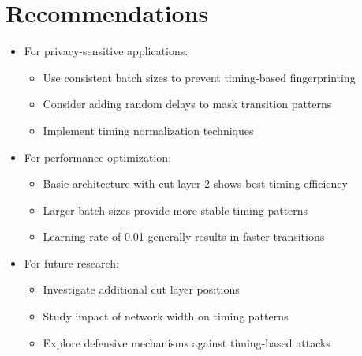 \documentclass[10pt]{article}
\begin{document}
\section{Recommendations}
\begin{itemize}
    \item For privacy-sensitive applications:
        \begin{itemize}
            \item Use consistent batch sizes to prevent timing-based fingerprinting
            \item Consider adding random delays to mask transition patterns
            \item Implement timing normalization techniques
        \end{itemize}
    \item For performance optimization:
        \begin{itemize}
            \item Basic architecture with cut layer 2 shows best timing efficiency
            \item Larger batch sizes provide more stable timing patterns
            \item Learning rate of 0.01 generally results in faster transitions
        \end{itemize}
    \item For future research:
        \begin{itemize}
            \item Investigate additional cut layer positions
            \item Study impact of network width on timing patterns
            \item Explore defensive mechanisms against timing-based attacks
        \end{itemize}
\end{itemize}
\end{document}
